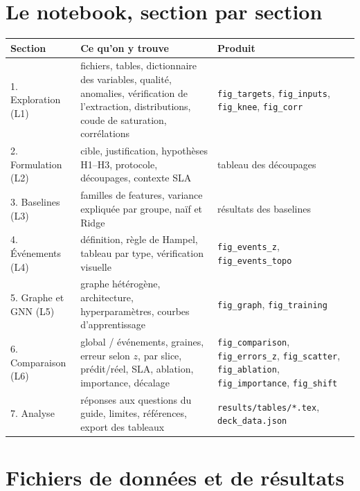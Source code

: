 \documentclass[11pt,a4paper]{article}
\newcommand{\f}[1]{\texttt{#1}}
\begin{document}
\section{Le notebook, section par section}
\begin{tabularx}{\linewidth}{@{}p{3.4cm}X>{\raggedright\arraybackslash}p{3.4cm}@{}}
\toprule
\bfseries Section & \bfseries Ce qu'on y trouve & \bfseries Produit\\
\midrule
1. Exploration (L1) & fichiers, tables, dictionnaire des variables, qualité, anomalies, vérification de l'extraction, distributions, coude de saturation, corrélations & \f{fig\_targets}, \f{fig\_inputs}, \f{fig\_knee}, \f{fig\_corr}\\
2. Formulation (L2) & cible, justification, hypothèses H1--H3, protocole, découpages, contexte SLA & tableau des découpages\\
3. Baselines (L3) & familles de features, variance expliquée par groupe, naïf et Ridge & résultats des baselines\\
4. Événements (L4) & définition, règle de Hampel, tableau par type, vérification visuelle & \f{fig\_events\_z}, \f{fig\_events\_topo}\\
5. Graphe et GNN (L5) & graphe hétérogène, architecture, hyperparamètres, courbes d'apprentissage & \f{fig\_graph}, \f{fig\_training}\\
6. Comparaison (L6) & global / événements, graines, erreur selon $z$, par slice, prédit/réel, SLA, ablation, importance, décalage & \f{fig\_comparison}, \f{fig\_errors\_z}, \f{fig\_scatter}, \f{fig\_ablation}, \f{fig\_importance}, \f{fig\_shift}\\
7. Analyse & réponses aux questions du guide, limites, références, export des tableaux & \f{results/tables/*.tex}, \f{deck\_data.json}\\
\bottomrule
\end{tabularx}

\section{Fichiers de données et de résultats}
\end{document}
